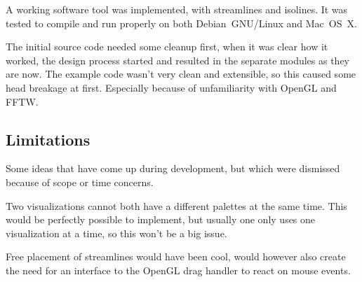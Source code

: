
A working software tool was implemented, with streamlines and isolines. It was
tested to compile and run properly on both Debian~GNU/Linux and Mac~OS~X.

The initial source code needed some cleanup first, when it was clear how it
worked, the design process started and resulted in the separate modules as they
are now. The example code wasn't very clean and extensible, so this caused some
head breakage at first. Especially because of unfamiliarity with OpenGL and
FFTW.

\subsection{Limitations}

Some ideas that have come up during development, but which were dismissed
because of scope or time concerns.

Two visualizations cannot both have a different palettes at the same time. This
would be perfectly possible to implement, but usually one only uses one
visualization at a time, so this won't be a big issue.

Free placement of streamlines would have been cool, would however also create
the need for an interface to the OpenGL drag handler to react on mouse events.

